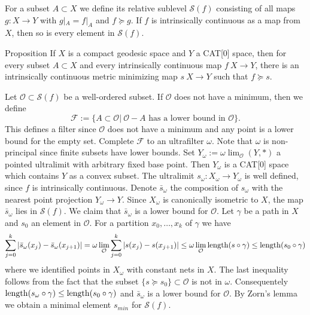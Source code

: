 \documentclass[a4paper,10pt]{amsart}
\begin{document}
For a subset $A\subset X$  we 
define its relative sublevel $\mathcal{S}(f)$ consisting of all maps $g:X\to Y$
with $g|_{A}=f|_{A}$ and $f\succcurlyeq g$. If $f$ is intrinsically continuous as a map from $X$, then
so is every element in $\mathcal{S}(f)$. 

\begin{thm}{Proposition}\label{prop:exist}
 If $X$ is a compact geodesic space and $Y$ a CAT[0] space, then for every subset $A\subset X$ and every intrinsically continuous map $f\:X\rightarrow Y$,
 there is an intrinsically continuous  metric minimizing map $s\:X\rightarrow Y$
 such that $f\succcurlyeq s$.
\end{thm}


Let $\mathcal{O}\subset\mathcal{S}(f)$ be a well-ordered subset. If $\mathcal{O}$ does not
have a minimum, then we define
$$
\mathcal{F}:=\{A\subset\mathcal{O}|\ \mathcal{O}-A\text{ has a lower bound in }\mathcal{O}\}.
$$
This defines a filter since $\mathcal{O}$ does not have a minimum and any point is a lower bound for the empty set.
Complete $\mathcal{F}$ to an ultrafilter $\omega$. Note that $\omega$ is non-principal since finite subsets have lower bounds.
Set $Y_\omega:=\omega\lim_{\mathcal{O}}(Y,*)$ a pointed ultralimit with arbitrary fixed base point. Then $Y_\omega$
is a CAT[0] space which contains $Y$ as a convex subset. The ultralimit $s_\omega:X_\omega\to Y_\omega$ is well defined, since
$f$ is intrinsically continuous. Denote $\bar s_\omega$ the composition of $s_\omega$ with the nearest point projection $Y_\omega\to Y$.
Since $X_\omega$ is canonically isometric to $X$, the map $\bar s_\omega$ lies in $\mathcal{S}(f)$. We claim that $\bar s_\omega$
is a lower bound for $\mathcal{O}$. Let $\gamma$ be a path in $X$ and $s_0$ an element in $\mathcal{O}$. For a partition $x_0,\ldots,x_k$
of $\gamma$ we have
$$
\sum_{j=0}^k|\bar s_\omega(x_j)-\bar s_\omega(x_{j+1})|=\omega\lim_{\mathcal{O}}\sum_{j=0}^k|s(x_j)-s(x_{j+1})|\leq \omega\lim_{\mathcal{O}}\mathop{\rm length}\nolimits(s\circ\gamma)\leq \mathop{\rm length}\nolimits(s_0\circ\gamma)
$$
where we identified points in $X_\omega$ with constant nets in $X$. The last inequality follows from the fact that the subset $\{s\succcurlyeq s_0\}\subset \mathcal{O}$
is not in $\omega$. Consequentely $\mathop{\rm length}\nolimits(s_\omega\circ\gamma)\leq \mathop{\rm length}\nolimits(s_0\circ\gamma)$ and $\bar s_\omega$
is a lower bound for $\mathcal{O}$. By Zorn's lemma we obtain a minimal element $s_{min}$ for $\mathcal{S}(f)$.
\qeds
\end{document}
